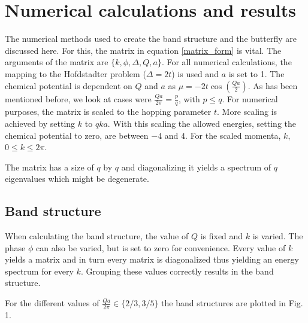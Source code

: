 \documentclass[letterpaper, 10 pt, conference]{ieeeconf}  %
\begin{document}
\section{Numerical calculations and results}
The numerical methods used to create the band structure and the butterfly are discussed here.
For this, the matrix in equation \ref{matrix_form} is vital.
The arguments of the matrix are $\{k,\phi,\Delta,Q,a\}$.
For all numerical calculations, the mapping to the Hofdstadter problem ($\Delta = 2t$) is used and $a$ is set to 1.
The chemical potential is dependent on $Q$ and $a$ as $\mu = -2t\cos(\frac{Qa}{2})$.
As has been mentioned before, we look at cases were
$\frac{Q a}{2 \pi} = \frac{p}{q}$, with $p \leq q$.
For numerical purposes, the matrix is scaled to the hopping parameter $t$.
More scaling is achieved by setting $k$ to $qka$.
With this scaling the allowed energies, setting the chemical potential to zero, are between $-4$ and $4$.
For the scaled momenta, $k$, $0 \leq k \leq 2 \pi$.

The matrix has a size of $q$ by $q$ and diagonalizing it yields a spectrum of $q$ eigenvalues which might be degenerate.

\subsection{Band structure}
When calculating the band structure, the value of $Q$ is fixed and $k$ is varied.
The phase $\phi$ can also be varied, but is set to zero for convenience.
Every value of $k$ yields a matrix and in turn every matrix is diagonalized thus yielding an energy spectrum for every $k$.
Grouping these values correctly results in the band structure.

For the different values of
$\frac{Q a}{2 \pi} \in \{2/3,3/5 \}$ the band structures are plotted in Fig. 1.
\end{document}
